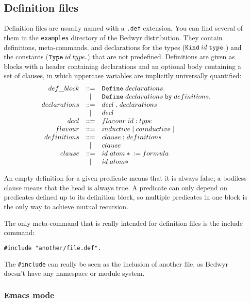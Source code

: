 \documentclass{article}
\begin{document}
\subsection{Definition files}

Definition files are usually named with a \verb|.def| extension. You can
find several of them in the \verb.examples. directory of the Bedwyr
distribution. They contain definitions, meta-commands, and declarations
for the types (${\tt Kind}\;id\;{\tt type.}$) and the constants (${\tt
Type}\;id\;type{\tt .}$) that are not predefined. Definitions are given
as blocks with a header containing declarations and an optional body
containing a set of clauses, in which uppercase variables are implicitly
universally quantified:
\[\begin{array}{rcl}
  def\_block    &::=& {\tt Define}\;declarations{\tt .} \\
                & | & {\tt Define}\;declarations\;{\tt by}\;
                     definitions{\tt.} \\
  declarations  &::=& decl\;{\tt,}\;declarations \\
                & | & decl\\
  decl          &::=& flavour\;id\;{\tt :}\;type \\
  flavour       &::=& inductive\;|\;coinductive\;|\\
  definitions   &::=& clause\;{\tt;}\;definitions \\
                & | & clause\\
  clause        &::=& id\;atom*\;{\tt:=}\;formula \\
                & | & id\;atom* \\
\end{array}\]

An empty definition for a given predicate means that it is always false;
a bodiless clause means that the head is always true.
A predicate can only depend on predicates defined up to its definition
block, so multiple predicates in one block is the only way to achieve
mutual recursion.

The only meta-command that is really intended for definition files is the
include command:
\begin{verbatim}#include "another/file.def".\end{verbatim}
The \verb.#include. can really be seen as the inclusion of another file,
as Bedwyr doesn't have any namespace or module system.

\subsubsection{Emacs mode}
\end{document}
